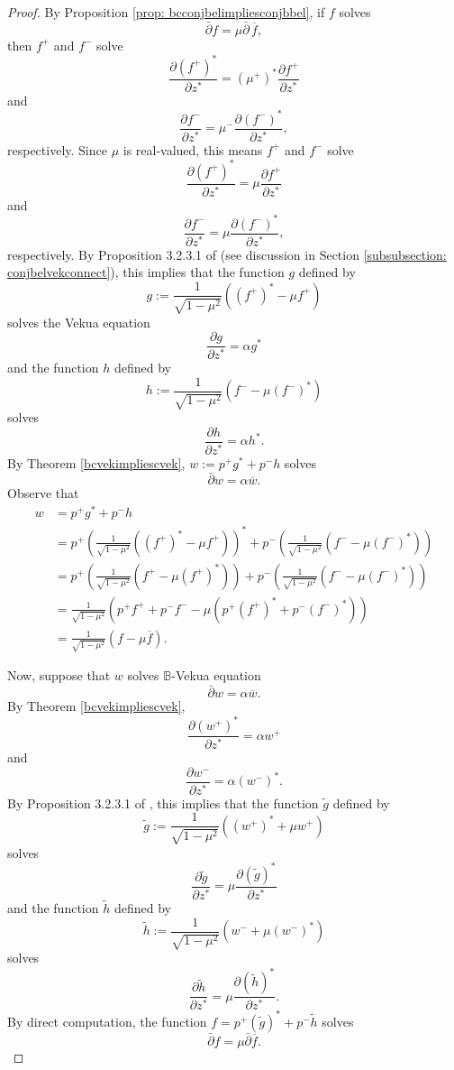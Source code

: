 \documentclass[12pt,reqno]{amsart}
\theoremstyle{definition}
\theoremstyle{remark}
\newcommand{\p}{\partial}
\newcommand{\dbar}{\bar\partial}
\newcommand{\bc}{\mathbb{B}}
\begin{document}
\begin{proof}
By Proposition \ref{prop: bcconjbelimpliesconjbbel}, if $f$ solves 
\[
        \dbar f = \mu\dbar \,\overline{f},
\]
then $f^+$ and $f^-$ solve
\[
        \frac{\p (f^+)^*}{\p z^*} = (\mu^+)^* \frac{\p f^+}{\p z^*}
    \]
    and
    \[
        \frac{\p f^-}{\p z^*} = \mu^- \frac{\p (f^-)^*}{\p z^*},
    \]
respectively. Since $\mu$ is real-valued, this means $f^+$ and $f^-$ solve
\[
        \frac{\p (f^+)^*}{\p z^*} = \mu \frac{\p f^+}{\p z^*}
    \]
    and
    \[
        \frac{\p f^-}{\p z^*} = \mu \frac{\p (f^-)^*}{\p z^*},
    \]
respectively.
By Proposition 3.2.3.1 of \cite{conjbel} (see discussion in Section \ref{subsubsection: conjbelvekconnect}), this implies that the function $g$ defined by 
\[
    g := \frac{1}{\sqrt{1-\mu^2}} ((f^+)^* - \mu f^+)
\]
solves the Vekua equation 
\[
    \frac{\p g}{\p z^*} = \alpha g^*
\]
and the function $h$ defined by
\[
    h := \frac{1}{\sqrt{1-\mu^2}} (f^- - \mu (f^-)^*)
\]
solves
\[
    \frac{\p h}{\p z^*} = \alpha h^*.
\]
By Theorem \ref{bcvekimpliescvek}, $w:= p^+ g^* + p^- h$ solves
\[
    \dbar w = \alpha  \overline{w}.
\]
Observe that 
\begin{align*}
        w &= p^+ g^* + p^- h\\
        &= p^+ \left(\frac{1}{\sqrt{1-\mu^2}} ((f^+)^* - \mu f^+)\right)^* + p^- \left( \frac{1}{\sqrt{1-\mu^2}} (f^- - \mu (f^-)^*)\right)\\
        &= p^+ \left(\frac{1}{\sqrt{1-\mu^2}} (f^+ - \mu (f^+)^*)\right) + p^- \left( \frac{1}{\sqrt{1-\mu^2}} (f^- - \mu (f^-)^*)\right)\\
        &= \frac{1}{\sqrt{1-\mu^2}}\left( p^+ f^+ + p^- f^- -\mu(p^+ (f^+)^* + p^- (f^-)^*) \right)\\
        &= \frac{1}{\sqrt{1-\mu^2}} ( f- \mu \overline{f}).
\end{align*}

Now, suppose that $w$ solves $\bc$-Vekua equation
\[
        \dbar w = \alpha \overline{w}.
\]
By Theorem \ref{bcvekimpliescvek}, 
\[
        \frac{\p (w^+)^*}{\p z^*} = \alpha w^+
\]
and 
\[
        \frac{\p w^-}{\p z^*} = \alpha (w^-)^*.
\]
By Proposition 3.2.3.1 of \cite{conjbel}, this implies that the function $\tilde{g}$ defined by 
\[
        \tilde{g} := \frac{1}{\sqrt{1-\mu^2}}((w^+)^* + \mu w^+)
\]
solves
\[
        \frac{\p \tilde{g}}{\p z^*} = \mu \frac{\p (\tilde{g})^*}{\p z^*}
\]
and the function $\tilde{h}$ defined by 
\[
        \tilde{h} := \frac{1}{\sqrt{1-\mu^2}}( w^- + \mu (w^-)^*)
\]
solves
\[
        \frac{\p \tilde{h}}{\p z^*} = \mu \frac{\p (\tilde{h})^*}{\p z^*}.
\]
By direct computation, the function $f = p^+ (\tilde{g})^* + p^- \tilde{h}$ solves 
\[
    \dbar f = \mu \dbar \overline{f}.
\]

\end{proof}
\end{document}
